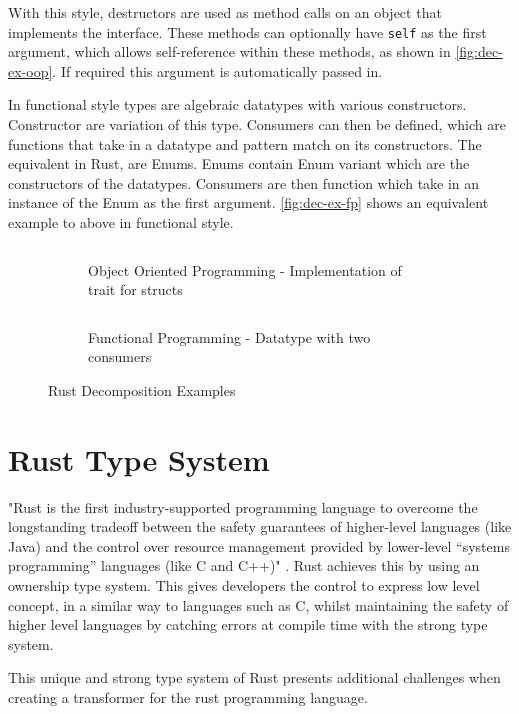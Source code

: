\documentclass[ oneside,%
                    author={James Elgar},
                    degree={MEng},
                     title={Bidirectional transformer between functional and \\ object-oriented programming in Rust},
                  subtitle={}]{dissertation}
\newcommand{\codefile}[2]{\inputminted[xleftmargin=20pt,linenos]{#1}{#2}}
\newcommand{\rustfile}[1]{\codefile{rust}{../src/#1.rs}}
\newcommand{\rustexample}[1]{\rustfile{examples/#1}}
\begin{document}
With this style, destructors are used as method calls on an object that implements the interface. These methods can optionally have \verb|self| as the first argument, which allows self-reference within these methods, as shown in \autoref{fig:dec-ex-oop}. If required this argument is automatically passed in.

In functional style types are algebraic datatypes with various constructors. Constructor are variation of this type. Consumers can then be defined, which are functions that take in a datatype and pattern match on its constructors. The equivalent in Rust, are Enums. Enums contain Enum variant which are the constructors of the datatypes. Consumers are then function which take in an instance of the Enum as the first argument.  \autoref{fig:dec-ex-fp} shows an equivalent example to above in functional style.

\begin{figure}
\centering
\begin{subfigure}{.5\textwidth}
    \rustexample{shape/oop}
    \caption{Object Oriented Programming - Implementation of trait for structs}
    \label{fig:dec-ex-oop}
\end{subfigure}%
\begin{subfigure}{.5\textwidth}
    \rustexample{shape/fp}
    \caption{Functional Programming - Datatype with two consumers}
    \label{fig:dec-ex-fp}
\end{subfigure}
\caption{Rust Decomposition Examples}
\label{fig:dec-ex}
\end{figure}



\section{Rust Type System}
"Rust is the first industry-supported programming language to overcome the longstanding tradeoff between the safety guarantees of higher-level languages (like Java) and the control over resource management provided by lower-level “systems programming” languages (like C and C++)" \cite{rustsafesystems}. Rust achieves this by using an ownership type system. This gives developers the control to express low level concept, in a similar way to languages such as C, whilst maintaining the safety of higher level languages by catching errors at compile time with the strong type system. 

This unique and strong type system of Rust presents additional challenges when creating a transformer for the rust programming language. 
\end{document}
